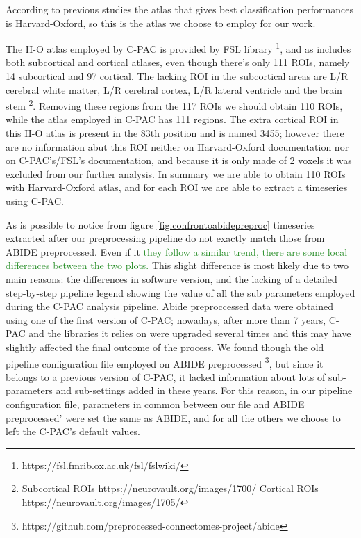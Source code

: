 \documentclass[11pt]{report}
\begin{document}
According to previous studies \cite{spera-2019} the atlas that gives best classification performances is Harvard-Oxford, so this is the atlas we choose to employ for our work.

The H-O atlas employed by C-PAC is provided by FSL library \footnote{https://fsl.fmrib.ox.ac.uk/fsl/fslwiki/}, and as includes both subcortical and cortical atlases, even though there's only 111 ROIs, namely 14 subcortical and 97 cortical.
The lacking ROI in the subcortical areas are L/R cerebral white matter, L/R cerebral cortex, L/R lateral ventricle and the brain stem \footnote{Subcortical ROIs https://neurovault.org/images/1700/ \quad Cortical ROIs https://neurovault.org/images/1705/ }.
Removing these regions from the 117 ROIs we should obtain 110 ROIs, while the atlas employed in C-PAC has 111 regions.
The extra cortical ROI in this H-O atlas is present in the 83th position and is named 3455; however there are no information abut this ROI neither on Harvard-Oxford documentation nor on C-PAC's/FSL's documentation, and because it is only made of 2 voxels it was excluded from our further analysis.
In summary we are able to obtain 110 ROIs with Harvard-Oxford atlas, and for each ROI we are able to extract a timeseries using C-PAC.


As is possible to notice from figure \ref{fig:confrontoabidepreproc} timeseries extracted after our preprocessing pipeline do not exactly match those from ABIDE preprocessed.
Even if it \textcolor{ForestGreen}{they follow a similar trend, there are some local differences between the two plots.}
This slight difference is most likely due to two main reasons: the differences in software version, and the lacking of a detailed step-by-step pipeline legend showing the value of all the sub parameters employed during the C-PAC analysis pipeline.
Abide preproccessed data were obtained using one of the first version of C-PAC; nowadays, after more than 7 years, C-PAC and the libraries it relies on were upgraded several times and this may have slightly affected the final outcome of the process.
We found though the old pipeline configuration file employed on ABIDE preprocessed \footnote{https://github.com/preprocessed-connectomes-project/abide}, but since it belongs to a previous version of C-PAC, it lacked information about lots of sub-parameters and sub-settings added in these years.
For this reason, in our pipeline configuration file, parameters in common between our file and ABIDE preprocessed' were set the same as ABIDE, and for all the others we choose to left the C-PAC's default values.
\end{document}
